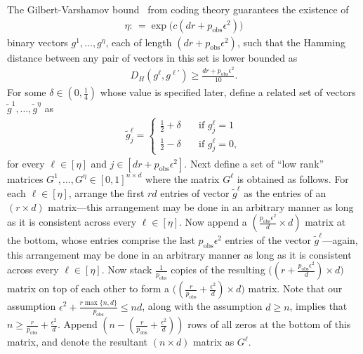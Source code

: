 \documentclass[11pt, hidelinks]{article} %
\newcommand{\defn}{\ensuremath{:\,=}}
\newcommand{\hamming}{\ensuremath{D_H}}
\newcommand{\half}{\ensuremath{{\frac{1}{2}}}}
\newcommand{\numrows}{n}
\newcommand{\numcols}{d}
\newcommand{\plaincon}{c}
\newcommand{\pp}{\ensuremath{p_{\mathrm{obs}}}}
\newcommand{\nnrank}{r}
\newcommand{\oracleeps}{\epsilon}
\newcommand{\packnum}{\ensuremath{\eta}}
\newcommand{\packvec}{g}
\newcommand{\packmat}{G}
\begin{document}
The Gilbert-Varshamov bound~\cite{gilbert1952comparison, varshamov1957estimate} from coding theory guarantees the existence of 
\begin{align*}
\packnum \defn \exp\Big({\plaincon (\numcols \nnrank + \pp \oracleeps^2)}\Big)
\end{align*}
binary vectors $\packvec^1,\ldots,\packvec^\packnum$, each of length $(\numcols \nnrank + \pp \oracleeps^2)$, such that the Hamming distance between any pair of vectors in this set is lower bounded as
\begin{align*}
\hamming(\packvec^\ell, \packvec^{\ell'}) \geq \frac{\numcols \nnrank + \pp \oracleeps^2}{10}.
\end{align*}
%
For some $\delta \in (0,\frac{1}{4})$ whose value is specified later, define a related set of vectors $\widetilde{\packvec}^1,\ldots,\widetilde{\packvec}^\packnum$ as 
\begin{align*}
\widetilde{\packvec}^\ell_j = 
\begin{cases}
\half + \delta & \quad \mbox{if } \packvec^\ell_j = 1 \\
\half - \delta & \quad \mbox{if } \packvec^\ell_j = 0,
\end{cases}
\end{align*}
for every $\ell \in [\packnum]$ and $j \in [\numcols \nnrank + \pp \oracleeps^2]$.
%
Next define a set of ``low rank'' matrices $\packmat^1,\ldots,\packmat^\packnum \in [0,1]^{\numrows \times \numcols}$ where the matrix $\packmat^\ell$ is obtained as follows. For each $\ell \in [\packnum]$, arrange the first $\nnrank \numcols$ entries of vector $\widetilde{\packvec}^\ell$ as the entries of an $(\nnrank \times \numcols)$ matrix---this arrangement may be done in an arbitrary manner as long as it is consistent across every $\ell \in [\packnum]$. Now append a $(\frac{\pp \oracleeps^2}{\numcols} \times \numcols)$ matrix at the bottom, whose entries comprise the last $\pp \oracleeps^2$ entries of the vector $\widetilde{\packvec}^\ell$---again, this arrangement may be done in an arbitrary manner as long as it is consistent across every $\ell \in [\packnum]$. Now stack $\frac{1}{\pp}$ copies of the resulting $\big( (\nnrank+ \frac{\pp \oracleeps^2}{\numcols} ) \times \numcols\big)$ matrix on top of each other to form a $\big((\frac{\nnrank}{\pp} + \frac{\oracleeps^2}{\numcols}) \times \numcols\big)$ matrix. Note that our assumption $\oracleeps^2 + \frac{\nnrank \max\{\numrows, \numcols\}}{\pp} \leq \numrows \numcols$, along with the assumption $\numcols \geq \numrows$, implies that $\numrows \geq \frac{\nnrank}{\pp}  +  \frac{\oracleeps^2}{\numcols}$. Append $(\numrows - (\frac{\nnrank}{\pp} + \frac{\oracleeps^2}{\numcols}))$ rows of all zeros at the bottom of this matrix, and denote the resultant $(\numrows \times \numcols)$ matrix as $\packmat^\ell$. 
\end{document}
